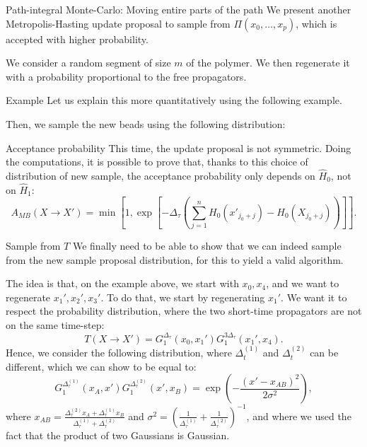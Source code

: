 \documentclass[a4paper]{article}
\begin{document}
\begin{parag}{Path-integral Monte-Carlo: Moving entire parts of the path}
    We present another Metropolis-Hasting update proposal to sample from $\Pi\left(x_0, \ldots, x_p\right)$, which is accepted with higher probability.

    We consider a random segment of size $m$ of the polymer. We then regenerate it with a probability proportional to the free propagators.

    \begin{subparag}{Example}
        Let us explain this more quantitatively using the following example.

        Then, we sample the new beads using the following distribution:
    \end{subparag}

    \begin{subparag}{Acceptance probability}
        This time, the update proposal is not symmetric. Doing the computations, it is possible to prove that, thanks to this choice of distribution of new sample, the acceptance probability only depends on $\hat{H}_0$, not on $\hat{H}_1$:
        \[A_{MB}\left(X \to X'\right) = \min\left[1, \exp\left[-\Delta_{\tau}\left(\sum_{j=1}^{n} H_0\left(x'_{j_0 + j}\right) - H_0\left(X_{j_0 + j}\right)\right)\right]\right].\]
    \end{subparag}

    \begin{subparag}{Sample from $T$}
        We finally need to be able to show that we can indeed sample from the new sample proposal distribution, for this to yield a valid algorithm.

        The idea is that, on the example above, we start with $x_0, x_4$, and we want to regenerate $x_1', x_2', x_3'$. To do that, we start by regenerating $x_1'$. We want it to respect the probability distribution, where the two short-time propagators are not on the same time-step: 
        \[T\left(X \to X'\right) = G_1^{\Delta_{\tau}}\left(x_0, x_1'\right) G_1^{3\Delta_{\tau}}\left(x_1', x_4\right).\]
        Hence, we consider the following distribution, where $\Delta_{t}^{\left(1\right)}$ and $\Delta_t^{\left(2\right)}$ can be different, which we can show to be equal to:
        \[G_1^{\Delta_{\tau}^{\left(1\right)}}\left(x_A, x'\right) G_1^{\Delta_{\tau}^{\left(2\right)}}\left(x', x_B\right) = \exp\left(-\frac{\left(x' - x_{AB}\right)^2}{2 \sigma^2}\right),\]
        where $x_{AB} = \frac{\Delta_{\tau}^{\left(2\right)} x_A + \Delta_{\tau}^{\left(1\right)} x_B}{\Delta_{\tau}^{\left(1\right)} + \Delta_{\tau}^{\left(2\right)}}$ and $\sigma^2 = \left(\frac{1}{\Delta_{\tau}^{\left(1\right)}} + \frac{1}{\Delta_{\tau}^{\left(2\right)}}\right)^{-1}$, and where we used the fact that the product of two Gaussians is Gaussian.


\end{subparag}
\end{parag}
\end{document}
